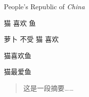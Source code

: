 \documentclass{ctexart}
\newcommand\PRC{People's Republic of \emph{China}}
\newcommand\loves[2]{#1 喜欢 #2}
\newcommand\hatedby[2]{#2 不受 #1 喜欢}
\newcommand\love[3][喜欢]{#2#1#3}
\begin{document}
    \PRC

    \loves{猫}{鱼}

    \hatedby{猫}{萝卜}

    \love{猫}{鱼}

    \love[最爱]{猫}{鱼}

    \begin{abstract}
        这是一段摘要……    
    \end{abstract}
\end{document}
